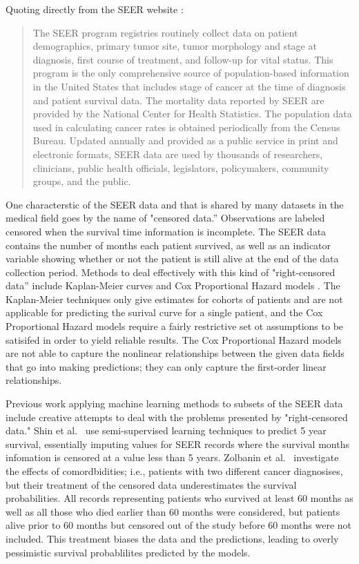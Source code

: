 \documentclass[a4paper,11pt]{article}
\begin{document}
Quoting directly from the SEER
website \citep{seerwebsite}:

\begin{quote}
The SEER program registries routinely collect data on patient demographics, primary tumor site, tumor morphology and stage at diagnosis, first course of treatment, and follow-up for vital status. This program is the only comprehensive source of population-based information in the United States that includes stage of cancer at the time of diagnosis and patient survival data. The mortality data reported by SEER are provided by the National Center for Health Statistics. The population data used in calculating cancer rates is obtained periodically from the Census Bureau. Updated annually and provided as a public service in print and electronic formats, SEER data are used by thousands of researchers, clinicians, public health officials, legislators, policymakers, community groups, and the public.
\end{quote}





One characterstic of the SEER data and that is shared by many datasets in the medical field 
goes by the name of "censored data.''
Observations are labeled censored when the survival time information is incomplete.
 The SEER data contains the number of months each patient survived, as well as an indicator variable showing whether or not the patient is still alive at the end of the data collection period.
Methods to deal effectively with this kind of "right-censored data'' include Kaplan-Meier curves
and Cox Proportional Hazard models \cite{cam}. The Kaplan-Meier techniques only give estimates for cohorts of patients and are not applicable for predicting the surival curve for a single patient, and the Cox Proportional Hazard models require a fairly restrictive set ot assumptions to be satisifed in order to yield reliable results. The Cox Proportional Hazard models are not able to capture the nonlinear relationships between the given data fields that go into making predictions; they can only capture the first-order linear relationships.

Previous work applying machine learning methods to subsets of the SEER data include creative attempts to deal with the problems presented by  "right-censored data." Shin et al.~\cite{ISI:000337467400005} use semi-supervised learning techniques to predict 5 year survival, essentially imputing values for SEER records where the survival months infomation is censored at a value less than 5 years. Zolbanin et al.~\cite{ISI:000355882700012} investigate the effects of comordbidities; i.e., patients with two different cancer diagnosises, but their treatment of the censored data underestimates the survival probabilities. All records representing patients who survived at least 60 months as well as all those who died earlier than 60 months were considered, but patients alive prior to 60 months but censored out of the study before 60 months were not included. This treatment biases the data and the predictions, leading to overly pessimistic survival probablilites predicted by the models.
\end{document}
